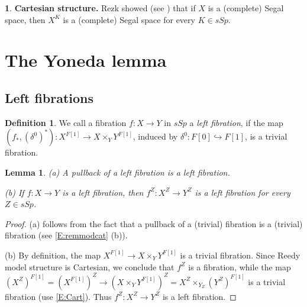 \documentclass[12pt]{amsart}
\theoremstyle{plain}
\newtheorem{Lem}[Thm]{Lemma}
\theoremstyle{definition}
\newtheorem{Def}[Thm]{Definition}
\newtheorem{Emp}[Thm]{}
\numberwithin{equation}{section}
\newcommand{\hra}{\hookrightarrow}
\newcommand{\dt}{\delta}
\newcommand{\re}[1]{\ref{E:#1}}
\begin{document}
\begin{Emp} \label{E:CartSS}
{\bf Cartesian structure.} Rezk showed (see \cite[Cor 7.3]{Re})
that if $X$ is a (complete) Segal space, then $X^K$ is a
(complete) Segal space for every $K\in sSp$.
\end{Emp}













\section{The Yoneda lemma}

\subsection{Left fibrations}
\begin{Def} \label{D:left}
We call a fibration $f:X\to Y$ in $sSp$ a {\em left
fibration}, if the map $(f_*,(\dt^0)^*):X^{F[1]}\to X\times_Y
Y^{F[1]}$, induced by $\dt^0:F[0]\hra F[1]$, is a
trivial fibration.
\end{Def}

\begin{Lem} \label{L:left}
(a) A pullback of a left fibration is a left fibration.

(b) If $f:X\to Y$ is a left fibration, then $f^Z:X^Z\to Y^Z$ is a
left fibration for every $Z\in sSp$.
\end{Lem}

\begin{proof}
(a) follows from the fact that a pullback of a (trivial) fibration
is a (trivial) fibration (see \re{remmodcat} (b)).

(b) By definition, the map $X^{F[1]}\to X\times_Y Y^{F[1]}$ is a
trivial fibration. Since Reedy model structure is Cartesian, we
conclude that $f^Z$ is a fibration, while the map
$(X^Z)^{F[1]}=(X^{F[1]})^Z\to (X\times_Y
Y^{F[1]})^Z=X^Z\times_{Y_Z} (Y^Z)^{F[1]}$ is a trivial fibration (use \re{Cart}).
Thus $f^Z:X^Z\to Y^Z$ is a left fibration.
\end{proof}








\end{document}
